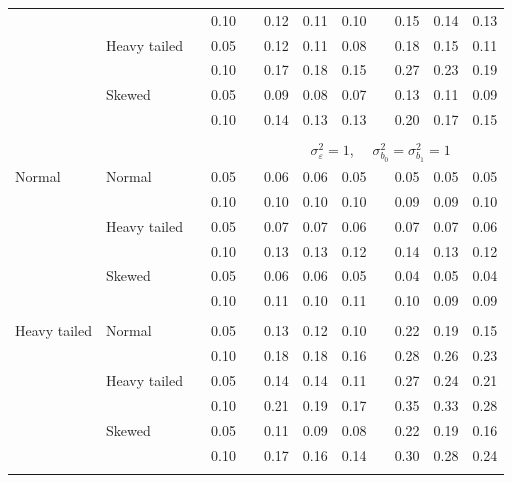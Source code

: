 \documentclass[12pt]{article} %
\begin{document}
\begin{table}[ht]
\begin{scriptsize}
\begin{center}
\begin{tabular}{ll p{.1cm} c p{.1cm} rrr p{.1cm} rrr}
             &              && 0.10 &&  0.12 & 0.11 & 0.10 && 0.15 & 0.14 & 0.13 \\ 
             & Heavy tailed && 0.05 &&  0.12 & 0.11 & 0.08 && 0.18 & 0.15 & 0.11 \\ 
             &              && 0.10 &&  0.17 & 0.18 & 0.15 && 0.27 & 0.23 & 0.19 \\ 
             & Skewed       && 0.05 &&  0.09 & 0.08 & 0.07 && 0.13 & 0.11 & 0.09 \\ 
             &              && 0.10 &&  0.14 & 0.13 & 0.13 && 0.20 & 0.17 & 0.15 \\ 

&&&&&&&&&&&\\
& && && \multicolumn{7}{c}{$\sigma_{\varepsilon}^2 = 1$, \ \ $\sigma_{b_0}^2 = \sigma_{b_1}^2 = 1$} \\ \cline{6-12}
\rowcolor{gray!20}Normal       & Normal       && 0.05 &&  0.06 & 0.06 & 0.05 && 0.05 & 0.05 & 0.05 \\ 
\rowcolor{gray!20}             &              && 0.10 &&  0.10 & 0.10 & 0.10 && 0.09 & 0.09 & 0.10 \\ 
\rowcolor{gray!20}             & Heavy tailed && 0.05 &&  0.07 & 0.07 & 0.06 && 0.07 & 0.07 & 0.06 \\ 
\rowcolor{gray!20}             &              && 0.10 &&  0.13 & 0.13 & 0.12 && 0.14 & 0.13 & 0.12 \\ 
\rowcolor{gray!20}             & Skewed       && 0.05 &&  0.06 & 0.06 & 0.05 && 0.04 & 0.05 & 0.04 \\ 
\rowcolor{gray!20}             &              && 0.10 &&  0.11 & 0.10 & 0.11 && 0.10 & 0.09 & 0.09 \\ 
             &&&&&&&&&&&\\
Heavy tailed & Normal       && 0.05 &&  0.13 & 0.12 & 0.10 && 0.22 & 0.19 & 0.15 \\ 
             &              && 0.10 &&  0.18 & 0.18 & 0.16 && 0.28 & 0.26 & 0.23 \\ 
             & Heavy tailed && 0.05 &&  0.14 & 0.14 & 0.11 && 0.27 & 0.24 & 0.21 \\ 
             &              && 0.10 &&  0.21 & 0.19 & 0.17 && 0.35 & 0.33 & 0.28 \\ 
             & Skewed       && 0.05 &&  0.11 & 0.09 & 0.08 && 0.22 & 0.19 & 0.16 \\ 
             &              && 0.10 &&  0.17 & 0.16 & 0.14 && 0.30 & 0.28 & 0.24 \\ 
             &&&&&&&&&&&\\

\end{tabular}
\end{center}
\end{scriptsize}
\end{table}
\end{document}
